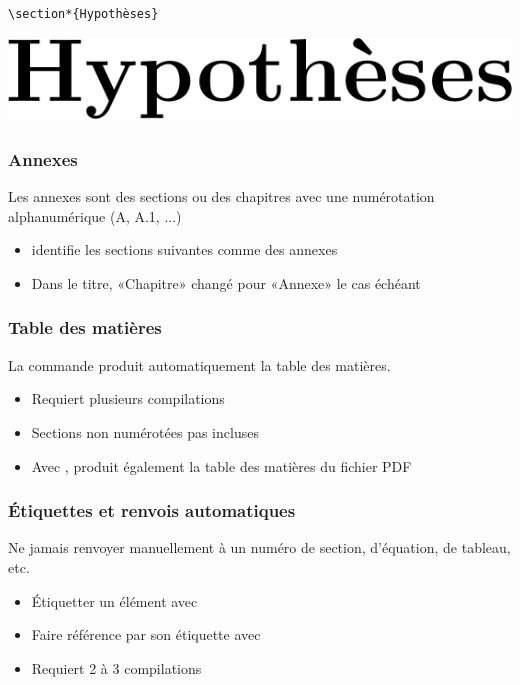 \begin{frame}[fragile=singleslide]
\begin{itemize}
\begin{demo}
\begin{minipage}{0.45\linewidth}
\begin{lstlisting}
\section*{Hypothèses}
\end{lstlisting}
      \end{minipage}
      \hfill
      \begin{minipage}{0.45\linewidth}
        \includegraphics[height=0.8\baselineskip,keepaspectratio]{images/section-non-num}
      \end{minipage}
    \end{demo}
  \end{itemize}
\end{frame}

\begin{frame}[fragile=singleslide]
  \frametitle{Annexes}

  Les annexes sont des sections ou des chapitres avec une numérotation
  alphanumérique (A, A.1, ...)
  \begin{itemize}
  \item {} identifie les sections suivantes comme des annexes
  \item Dans le titre, «Chapitre» changé pour «Annexe» le cas échéant
  \end{itemize}
\end{frame}

\begin{frame}[fragile=singleslide]
  \frametitle{Table des matières}

  La commande  produit automatiquement la table
  des matières.

  \begin{itemize}
  \item Requiert plusieurs compilations
  \item Sections non numérotées pas incluses
  \item Avec , produit également la table des
    matières du fichier PDF
  \end{itemize}
\end{frame}

\begin{frame}
  \frametitle{Étiquettes et renvois automatiques}

  Ne \alert{jamais} renvoyer manuellement à un numéro de section,
  d'équation, de tableau, etc.

  \begin{itemize}
  \item Étiquetter un élément avec 
  \item Faire référence par son étiquette avec 
  \item Requiert 2 à 3 compilations
  \end{itemize}
\end{frame}

